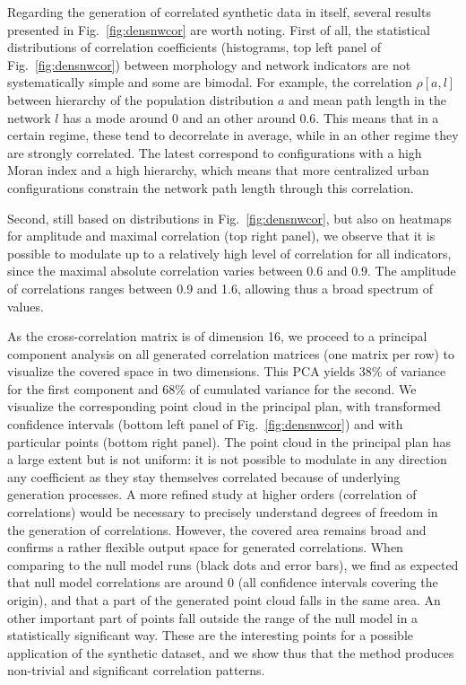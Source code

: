\documentclass{bmcart}
\begin{document}
Regarding the generation of correlated synthetic data in itself, several results presented in Fig.~\ref{fig:densnwcor} are worth noting. First of all, the statistical distributions of correlation coefficients (histograms, top left panel of Fig.~\ref{fig:densnwcor}) between morphology and network indicators are not systematically simple and some are bimodal. For example, the correlation $\rho[a,l]$ between hierarchy of the population distribution $a$ and mean path length in the network $l$ has a mode around 0 and an other around 0.6. This means that in a certain regime, these tend to decorrelate in average, while in an other regime they are strongly correlated. The latest correspond to configurations with a high Moran index and a high hierarchy, which means that more centralized urban configurations constrain the network path length through this correlation.

Second, still based on distributions in Fig.~\ref{fig:densnwcor}, but also on heatmaps for amplitude and maximal correlation (top right panel), we observe that it is possible to modulate up to a relatively high level of correlation for all indicators, since the maximal absolute correlation varies between 0.6 and 0.9. The amplitude of correlations ranges between 0.9 and 1.6, allowing thus a broad spectrum of values.

As the cross-correlation matrix is of dimension 16, we proceed to a principal component analysis on all generated correlation matrices (one matrix per row) to visualize the covered space in two dimensions. This PCA yields 38\% of variance for the first component and 68\% of cumulated variance for the second. We visualize the corresponding point cloud in the principal plan, with transformed confidence intervals (bottom left panel of Fig.~\ref{fig:densnwcor}) and with particular points (bottom right panel). The point cloud in the principal plan has a large extent but is not uniform: it is not possible to modulate in any direction any coefficient as they stay themselves correlated because of underlying generation processes. A more refined study at higher orders (correlation of correlations) would be necessary to precisely understand degrees of freedom in the generation of correlations. However, the covered area remains broad and confirms a rather flexible output space for generated correlations. When comparing to the null model runs (black dots and error bars), we find as expected that null model correlations are around 0 (all confidence intervals covering the origin), and that a part of the generated point cloud falls in the same area. An other important part of points fall outside the range of the null model in a statistically significant way. These are the interesting points for a possible application of the synthetic dataset, and we show thus that the method produces non-trivial and significant correlation patterns.
\end{document}
